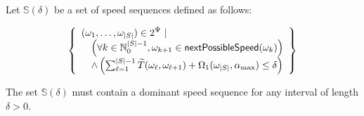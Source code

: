 Let $\mathbb{S}(\delta)$ be a set of speed sequences defined as follows:

\begin{equation}\label{eqn:dominant-set}
    \left\{
    \begin{array}{ll}
        \lefteqn{(\omega_1, \ldots, \omega_{|S|}) \in 2^\Psi~|}& \\
         & \left(\forall k \in \mathbb{N}_0^{|S|-1}, \omega_{k+1} \in {\sf nextPossibleSpeed}(\omega_k)\right)\\
         & \wedge \left(\sum_{\ell=1}^{|S|-1} \widetilde{T}(\omega_\ell, \omega_{\ell+1}) + \Omega_1(\omega_{|S|}, \alpha_{\max}) \leq \delta \right)
    \end{array}
    \right\}
\end{equation}


\begin{theorem}\label{thm:dominant-set}
The set $\mathbb{S}(\delta)$ must contain a dominant speed sequence for any interval of length $\delta >0$.
\end{theorem}
